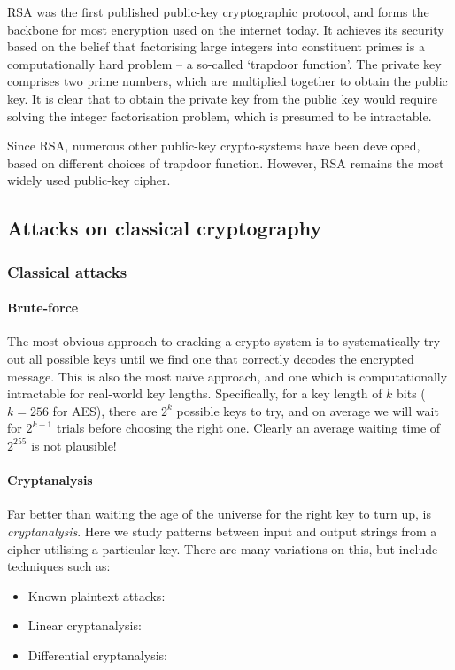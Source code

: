 RSA \cite{bib:RSA} was the first published public-key cryptographic protocol, and forms the backbone for most encryption used on the internet today. It achieves its security based on the belief that factorising large integers into constituent primes is a computationally hard problem -- a so-called `trapdoor function'. The private key comprises two prime numbers, which are multiplied together to obtain the public key. It is clear that to obtain the private key from the public key would require solving the integer factorisation problem, which is presumed to be intractable.

Since RSA, numerous other public-key crypto-systems have been developed, based on different choices of trapdoor function. However, RSA remains the most widely used public-key cipher.

\subsection{Attacks on classical cryptography}\label{sec:attacks_on_class}

\subsubsection{Classical attacks}

\paragraph{Brute-force}\label{sec:brute_force_attack}

The most obvious approach to cracking a crypto-system is to systematically try out all possible keys until we find one that correctly decodes the encrypted message. This is also the most na\"ive approach, and one which is computationally intractable for real-world key lengths. Specifically, for a key length of $k$ bits (\mbox{$k=256$} for AES), there are $2^k$ possible keys to try, and on average we will wait for $2^{k-1}$ trials before choosing the right one. Clearly an average waiting time of $2^{255}$ is not plausible!

\paragraph{Cryptanalysis}

Far better than waiting the age of the universe for the right key to turn up, is \textit{cryptanalysis}. Here we study patterns between input and output strings from a cipher utilising a particular key. There are many variations on this, but include techniques such as:
\begin{itemize}
	\item Known plaintext attacks: 
	\item Linear cryptanalysis: 
	\item Differential cryptanalysis: 
\end{itemize}
 
